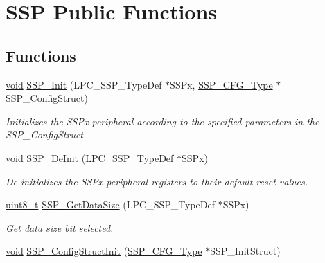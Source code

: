 \hypertarget{group___s_s_p___public___functions}{}\section{S\+SP Public Functions}
\label{group___s_s_p___public___functions}
\subsection*{Functions}
\begin{DoxyCompactItemize}
\item 
\hyperlink{usb__devapi_8h_afabf60e7f57651d6d595a02c75f07cd0}{void} \hyperlink{group___s_s_p___public___functions_ga27795785a9e9370ea2c17d65d3e2fcd6}{S\+S\+P\+\_\+\+Init} (L\+P\+C\+\_\+\+S\+S\+P\+\_\+\+Type\+Def $\ast$S\+S\+Px, \hyperlink{struct_s_s_p___c_f_g___type}{S\+S\+P\+\_\+\+C\+F\+G\+\_\+\+Type} $\ast$S\+S\+P\+\_\+\+Config\+Struct)
\begin{DoxyCompactList}\small\item\em Initializes the S\+S\+Px peripheral according to the specified parameters in the S\+S\+P\+\_\+\+Config\+Struct. \end{DoxyCompactList}\item 
\hyperlink{usb__devapi_8h_afabf60e7f57651d6d595a02c75f07cd0}{void} \hyperlink{group___s_s_p___public___functions_ga7075ef3eb4f2714ade40f59eec228fb2}{S\+S\+P\+\_\+\+De\+Init} (L\+P\+C\+\_\+\+S\+S\+P\+\_\+\+Type\+Def $\ast$S\+S\+Px)
\begin{DoxyCompactList}\small\item\em De-\/initializes the S\+S\+Px peripheral registers to their default reset values. \end{DoxyCompactList}\item 
\hyperlink{_p_e___types_8h_aba7bc1797add20fe3efdf37ced1182c5}{uint8\+\_\+t} \hyperlink{group___s_s_p___public___functions_ga4fc40b79a0bd2b6057803fe6ccd97ebb}{S\+S\+P\+\_\+\+Get\+Data\+Size} (L\+P\+C\+\_\+\+S\+S\+P\+\_\+\+Type\+Def $\ast$S\+S\+Px)
\begin{DoxyCompactList}\small\item\em Get data size bit selected. \end{DoxyCompactList}\item 
\hyperlink{usb__devapi_8h_afabf60e7f57651d6d595a02c75f07cd0}{void} \hyperlink{group___s_s_p___public___functions_ga99c27d390c1b6e12864b1fd459ff7f69}{S\+S\+P\+\_\+\+Config\+Struct\+Init} (\hyperlink{struct_s_s_p___c_f_g___type}{S\+S\+P\+\_\+\+C\+F\+G\+\_\+\+Type} $\ast$S\+S\+P\+\_\+\+Init\+Struct)

\end{DoxyCompactItemize}
